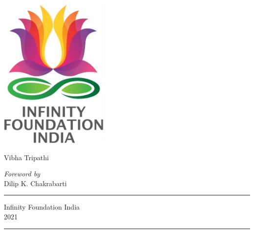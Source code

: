 \thispagestyle{empty}
\begin{center}
\includegraphics[scale=0.3]{images/logo.png}
\bigskip


\bigskip
\end{center}
\medskip

\begin{center}
{\fontsize{20}{24}\selectfont {History of Iron Technology in India}}

\medskip

{\fontsize{11}{15}\selectfont {(From Beginning to Pre-modern Times)}}

\vfill


\bigskip
 
{\fontsize{11}{15}\selectfont 
Vibha Tripathi}\par

\bigskip
 
{\fontsize{8}{10}\selectfont 
{\textit{Foreword by}}\\[3pt]
Dilip K. Chakrabarti}\par
\vfill

\rule{5cm}{1pt}

{\fontsize{12}{14}\selectfont
Infinity Foundation India\\[4pt]
2021}

\rule{5cm}{1pt}
\end{center}




